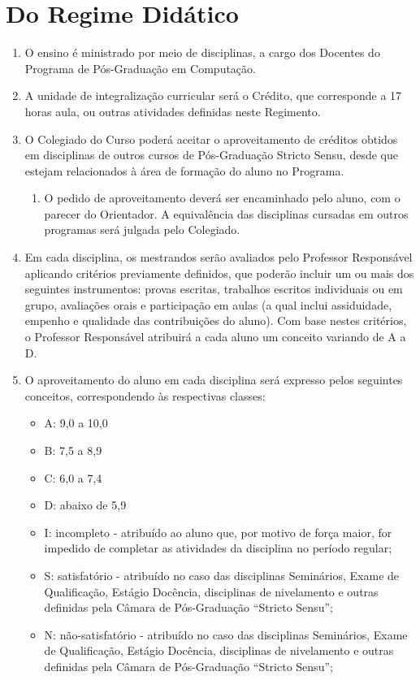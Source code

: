 \documentclass{article}
\newcommand{\singleitem}{\item[Parágrafo Único.]}
\begin{document}
\section{Do Regime Didático}
\begin{enumerate}
	\item O ensino é ministrado por meio de disciplinas, a cargo dos Docentes do Programa de Pós-Graduação em Computação.
	\item A unidade de integralização curricular será o Crédito, que corresponde a 17 horas aula, ou outras atividades definidas neste Regimento.
	\item O Colegiado do Curso poderá aceitar o aproveitamento de créditos obtidos em disciplinas de outros cursos de Pós-Graduação Stricto Sensu, desde que estejam relacionados à área de formação do aluno no Programa.
	\begin{enumerate}
		\singleitem O pedido de aproveitamento deverá ser encaminhado pelo aluno, com o parecer do Orientador. A equivalência das disciplinas cursadas em outros programas será julgada pelo Colegiado.
	\end{enumerate}
	\item Em cada disciplina, os mestrandos serão avaliados pelo Professor Responsável aplicando critérios previamente definidos, que poderão incluir um ou mais dos seguintes instrumentos: provas escritas, trabalhos escritos individuais ou em grupo, avaliações orais e participação em aulas (a qual inclui assiduidade, empenho e qualidade das contribuições do aluno). Com base nestes critérios, o Professor Responsável atribuirá a cada aluno um conceito variando de A a D.
	\item O aproveitamento do aluno em cada disciplina será expresso pelos seguintes conceitos, correspondendo às respectivas classes:
	\begin{itemize}
		\item A: 9,0 a 10,0
		\item B: 7,5 a 8,9
		\item C: 6,0 a 7,4
		\item D: abaixo de 5,9
		\item I: incompleto - atribuído ao aluno que, por motivo de força maior, for impedido de completar as atividades da disciplina no período regular;
		\item S: satisfatório - atribuído no caso das disciplinas Seminários, Exame de Qualificação, Estágio Docência, disciplinas de nivelamento e outras definidas pela Câmara de Pós-Graduação ``Stricto Sensu'';
		\item N: não-satisfatório - atribuído no caso das disciplinas Seminários, Exame de Qualificação, Estágio Docência, disciplinas de nivelamento e outras definidas pela Câmara de Pós-Graduação ``Stricto Sensu'';

\end{itemize}
\end{enumerate}
\end{document}
